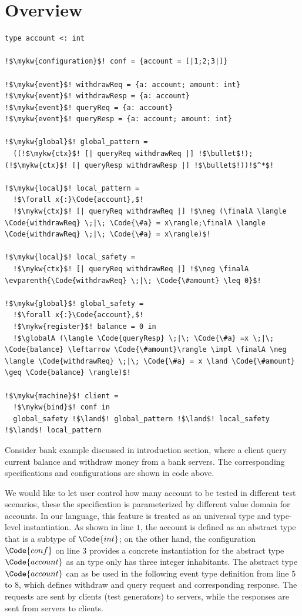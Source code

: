 \section{Overview}

\begin{verbatim}
type account <: int

!$\mykw{configuration}$! conf = {account = [|1;2;3|]}

!$\mykw{event}$! withdrawReq = {a: account; amount: int}
!$\mykw{event}$! withdrawResp = {a: account}
!$\mykw{event}$! queryReq = {a: account}
!$\mykw{event}$! queryResp = {a: account; amount: int}

!$\mykw{global}$! global_pattern =
  ((!$\mykw{ctx}$! [| queryReq withdrawReq |] !$\bullet$!); (!$\mykw{ctx}$! [| queryResp withdrawResp |] !$\bullet$!))!$^*$!

!$\mykw{local}$! local_pattern = 
  !$\forall x{:}\Code{account},$! 
  !$\mykw{ctx}$! [| queryReq withdrawReq |] !$\neg (\finalA \langle \Code{withdrawReq} \;|\; \Code{\#a} = x\rangle;\finalA \langle \Code{withdrawReq} \;|\; \Code{\#a} = x\rangle)$!

!$\mykw{local}$! local_safety = 
  !$\mykw{ctx}$! [| queryReq withdrawReq |] !$\neg \finalA \evparenth{\Code{withdrawReq} \;|\; \Code{\#amount} \leq 0}$!

!$\mykw{global}$! global_safety = 
  !$\forall x{:}\Code{account},$!
  !$\mykw{register}$! balance = 0 in
  !$\globalA (\langle \Code{queryResp} \;|\; \Code{\#a} =x \;|\; \Code{balance} \leftarrow \Code{\#amount}\rangle \impl \finalA \neg \langle \Code{withdrawReq} \;|\; \Code{\#a} = x \land \Code{\#amount} \geq \Code{balance} \rangle)$!

!$\mykw{machine}$! client =
  !$\mykw{bind}$! conf in 
  global_safety !$\land$! global_pattern !$\land$! local_safety !$\land$! local_pattern
\end{verbatim}

Consider bank example discussed in introduction section, where a client query current balance and withdraw money from a bank servers. The corresponding specifications and configurations are shown in code above. 

We would like to let user control how many account to be tested in different test scenarios, these the specification is parameterized by different value domain for accounts. In our language, this feature is treated as an universal type and type-level instantiation. As shown in line $1$, the account is defined as an abstract type that is a subtype of $\Code{int}$; on the other hand, the configuration $\Code{conf}$ on line $3$ provides a concrete instantiation for the abstract type $\Code{account}$ as an type only has three integer inhabitants. The abstract type $\Code{account}$ can as be used in the following event type definition from line $5$ to $8$, which defines withdraw and query request and corresponding response. The requests are sent by clients (test generators) to servers, while the responses are sent from servers to clients. 

